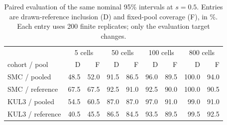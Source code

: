 \begin{table}[htbp]
\centering\small
\caption{Paired evaluation of the same nominal 95\% intervals at $s=0.5$.
Entries are drawn-reference inclusion (D) and fixed-pool coverage (F), in \%.
Each entry uses 200 finite replicates; only the evaluation target changes.}
\label{tab:fixedpool}
\begin{tabular}{@{}lrrrrrrrr@{}}
\toprule
& \multicolumn{2}{c}{5 cells} & \multicolumn{2}{c}{50 cells} & \multicolumn{2}{c}{100 cells} & \multicolumn{2}{c}{800 cells} \\
cohort / pool & D & F & D & F & D & F & D & F \\
\midrule
SMC / pooled & 48.5 & 52.0 & 91.5 & 86.5 & 96.0 & 89.5 & 100.0 & 94.0 \\
SMC / reference & 67.5 & 67.5 & 92.5 & 91.0 & 92.5 & 90.0 & 100.0 & 90.5 \\
KUL3 / pooled & 54.5 & 60.5 & 87.0 & 87.0 & 97.0 & 91.0 & 99.0 & 91.0 \\
KUL3 / reference & 40.5 & 45.5 & 86.5 & 84.5 & 93.5 & 89.5 & 99.5 & 92.5 \\
\bottomrule
\end{tabular}
\end{table}
